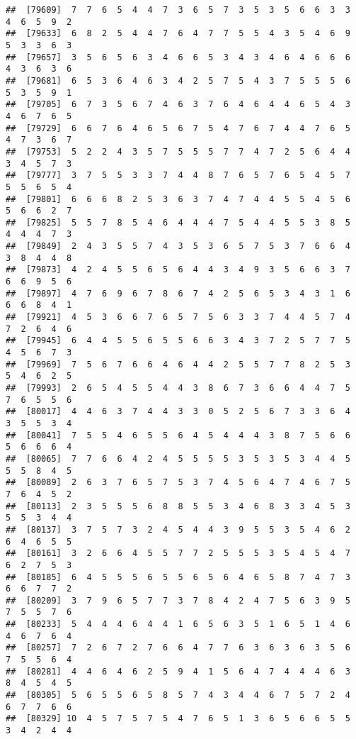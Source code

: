 \documentclass[
]{book}
\begin{document}
\begin{verbatim}
##  [79609]  7  7  6  5  4  4  7  3  6  5  7  3  5  3  5  6  6  3  3  4  6  5  9  2
##  [79633]  6  8  2  5  4  4  7  6  4  7  7  5  5  4  3  5  4  6  9  5  3  3  6  3
##  [79657]  3  5  6  5  6  3  4  6  6  5  3  4  3  4  6  4  6  6  6  4  3  6  3  6
##  [79681]  6  5  3  6  4  6  3  4  2  5  7  5  4  3  7  5  5  5  6  5  3  5  9  1
##  [79705]  6  7  3  5  6  7  4  6  3  7  6  4  6  4  4  6  5  4  3  4  6  7  6  5
##  [79729]  6  6  7  6  4  6  5  6  7  5  4  7  6  7  4  4  7  6  5  4  7  3  6  7
##  [79753]  5  2  2  4  3  5  7  5  5  5  7  7  4  7  2  5  6  4  4  3  4  5  7  3
##  [79777]  3  7  5  5  3  3  7  4  4  8  7  6  5  7  6  5  4  5  7  5  5  6  5  4
##  [79801]  6  6  6  8  2  5  3  6  3  7  4  7  4  4  5  5  4  5  6  5  6  6  2  7
##  [79825]  5  5  7  8  5  4  6  4  4  4  7  5  4  4  5  5  3  8  5  4  4  4  7  3
##  [79849]  2  4  3  5  5  7  4  3  5  3  6  5  7  5  3  7  6  6  4  3  8  4  4  8
##  [79873]  4  2  4  5  5  6  5  6  4  4  3  4  9  3  5  6  6  3  7  6  6  9  5  6
##  [79897]  4  7  6  9  6  7  8  6  7  4  2  5  6  5  3  4  3  1  6  6  6  8  4  1
##  [79921]  4  5  3  6  6  7  6  5  7  5  6  3  3  7  4  4  5  7  4  7  2  6  4  6
##  [79945]  6  4  4  5  5  6  5  5  6  6  3  4  3  7  2  5  7  7  5  4  5  6  7  3
##  [79969]  7  5  6  7  6  6  4  6  4  4  2  5  5  7  7  8  2  5  3  5  4  6  2  5
##  [79993]  2  6  5  4  5  5  4  4  3  8  6  7  3  6  6  4  4  7  5  7  6  5  5  6
##  [80017]  4  4  6  3  7  4  4  3  3  0  5  2  5  6  7  3  3  6  4  3  5  5  3  4
##  [80041]  7  5  5  4  6  5  5  6  4  5  4  4  4  3  8  7  5  6  6  5  6  6  6  4
##  [80065]  7  7  6  6  4  2  4  5  5  5  5  3  5  3  5  3  4  4  5  5  5  8  4  5
##  [80089]  2  6  3  7  6  5  7  5  3  7  4  5  6  4  7  4  6  7  5  7  6  4  5  2
##  [80113]  2  3  5  5  5  6  8  8  5  5  3  4  6  8  3  3  4  5  3  5  5  3  4  4
##  [80137]  3  7  5  7  3  2  4  5  4  4  3  9  5  5  3  5  4  6  2  6  4  6  5  5
##  [80161]  3  2  6  6  4  5  5  7  7  2  5  5  5  3  5  4  5  4  7  6  2  7  5  3
##  [80185]  6  4  5  5  5  6  5  5  6  5  6  4  6  5  8  7  4  7  3  6  6  7  7  2
##  [80209]  3  7  9  6  5  7  7  3  7  8  4  2  4  7  5  6  3  9  5  7  5  5  7  6
##  [80233]  5  4  4  4  6  4  4  1  6  5  6  3  5  1  6  5  1  4  6  4  6  7  6  4
##  [80257]  7  2  6  7  2  7  6  6  4  7  7  6  3  6  3  6  3  5  6  7  5  5  6  4
##  [80281]  4  4  6  4  6  2  5  9  4  1  5  6  4  7  4  4  4  6  3  8  4  5  4  5
##  [80305]  5  6  5  5  6  5  8  5  7  4  3  4  4  6  7  5  7  2  4  6  7  7  6  6
##  [80329] 10  4  5  7  5  7  5  4  7  6  5  1  3  6  5  6  6  5  5  3  4  2  4  4

\end{verbatim}
\end{document}
